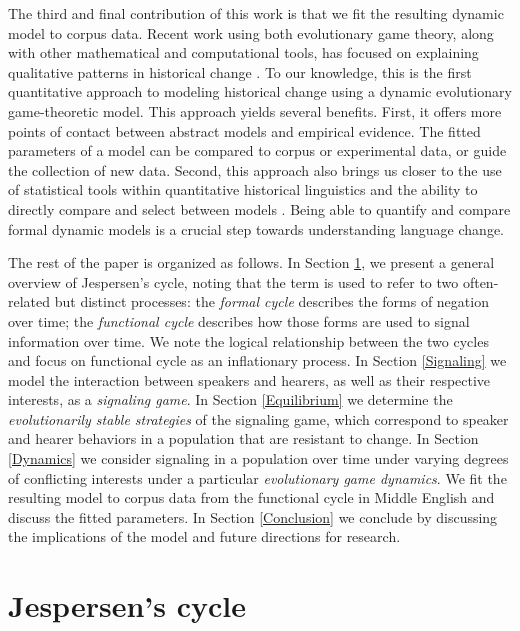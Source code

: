 \documentclass[linguex]{sp}
\theoremstyle{definition} \newtheorem{definition}{Definition}
\begin{document}
The third and final contribution of this work is that we fit the resulting dynamic model to corpus data. Recent work using both evolutionary game theory, along with other mathematical and computational tools, has focused on explaining qualitative patterns in historical change \citep{schaden2012, deo2015, yanovich2015, yanovich2016, enke2016}. To our knowledge, this is the first quantitative approach to modeling historical change using a dynamic evolutionary game-theoretic model. This approach yields several benefits. First, it offers more points of contact between abstract models and empirical evidence. The fitted parameters of a model can be compared to corpus or experimental data, or guide the collection of new data. Second, this approach also brings us closer to the use of statistical tools within quantitative historical linguistics \citep{kroch1989,altmann-etal1983} and the ability to directly compare and select between models \citep{burnham2003}. Being able to quantify and compare formal dynamic models is a crucial step towards understanding language change.

The rest of the paper is organized as follows. In Section \ref{Jespersen's cycle}, we present a general overview of Jespersen's cycle, noting that the term is used to refer to two often-related but distinct processes: the \emph{formal cycle} describes the forms of negation over time; the \emph{functional cycle} describes how those forms are used to signal information over time. We note the logical relationship between the two cycles and focus on functional cycle as an inflationary process. In Section \ref{Signaling} we model the interaction between speakers and hearers, as well as their respective interests, as a \emph{signaling game}. In Section \ref{Equilibrium} we determine the \emph{evolutionarily stable strategies} of the signaling game, which correspond to speaker and hearer behaviors in a population that are resistant to change. In Section \ref{Dynamics} we consider signaling in a population over time under varying degrees of conflicting interests under a particular \emph{evolutionary game dynamics}. We fit the resulting model to corpus data from the functional cycle in Middle English and discuss the fitted parameters. In Section \ref{Conclusion} we conclude by discussing the implications of the model and future directions for research.


\section{Jespersen's cycle}
\label{Jespersen's cycle}
\end{document}
